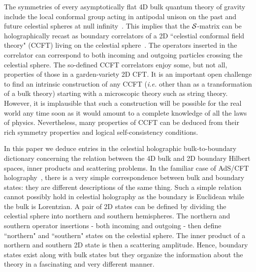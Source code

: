 \documentclass[11pt]{article}
\numberwithin{equation}{section}
\begin{document}
The symmetries of every asymptotically flat 4D bulk quantum theory of gravity include the local conformal group acting in antipodal unison on the past and future celestial spheres at null infinity~\cite{Cachazo:2014fwa,Kapec:2014opa}. This implies that the $\cal S$-matrix can be holographically recast as boundary correlators of a 2D ``celestial conformal field theory" (CCFT) living on the celestial sphere~\cite{He:2015zea,Kapec:2016jld,Bagchi:2016bcd,Cheung:2016iub,Pasterski:2016qvg,Cardona:2017keg,Pasterski:2017kqt}.  The operators inserted in the correlator can correspond to both incoming and outgoing particles crossing the celestial sphere. The so-defined CCFT correlators enjoy some, but not all, properties of those in a garden-variety 2D CFT. It is an important open challenge  to find an intrinsic construction of any CCFT ({\it i.e.} other than as a transformation of a bulk theory)  starting with a microscopic theory such as string theory. However, it is implausible that such a construction will be possible for the real world any time soon as it would amount to a complete knowledge of all the laws of physics. Nevertheless, many properties of CCFT can be deduced from their rich symmetry properties and logical self-consistency conditions.

In this paper we deduce  entries in the celestial holographic  bulk-to-boundary dictionary concerning  the relation between the 4D bulk and 2D boundary Hilbert spaces, inner products and scattering problems. In the familiar case of AdS/CFT holography~\cite{Aharony:1999ti}, there is a very simple correspondence between bulk and boundary states: they are different descriptions of the same thing. Such a simple relation cannot possibly hold in celestial holography as the boundary is Euclidean while the bulk is Lorentzian.  A pair of 2D states can be defined by dividing the celestial sphere into northern and southern hemispheres. The northern and southern operator insertions - both  incoming and outgoing - then define ``northern" and ``southern" states on the celestial sphere. The inner product of a northern and southern 2D state is then a scattering amplitude.  Hence,  boundary states exist along with bulk states but they organize the information about the theory in a fascinating and very different manner. 
  
\end{document}
